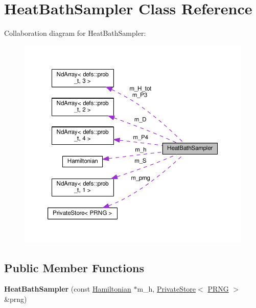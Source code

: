 \hypertarget{classHeatBathSampler}{}\section{Heat\+Bath\+Sampler Class Reference}
\label{classHeatBathSampler}


Collaboration diagram for Heat\+Bath\+Sampler\+:\nopagebreak
\begin{figure}[H]
\begin{center}
\leavevmode
\includegraphics[width=350pt]{classHeatBathSampler__coll__graph}
\end{center}
\end{figure}
\subsection*{Public Member Functions}
\begin{DoxyCompactItemize}
\item 
{\bfseries Heat\+Bath\+Sampler} (const \hyperlink{classHamiltonian}{Hamiltonian} $\ast$m\+\_\+h, \hyperlink{classPrivateStore}{Private\+Store}$<$ \hyperlink{classPRNG}{P\+R\+NG} $>$ \&prng)\hypertarget{classHeatBathSampler_a1451ee391a7bf45458d1200a23cb7ec4}{}\label{classHeatBathSampler_a1451ee391a7bf45458d1200a23cb7ec4}

\end{DoxyCompactItemize}
